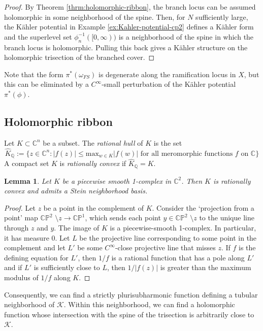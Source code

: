 \documentclass[11pt]{amsart}
\newtheorem{lemma}[theorem]{Lemma}
\theoremstyle{definition}
\theoremstyle{remark}
\numberwithin{equation}{section}
\newcommand{\QQ}{\mathbb{Q}}
\newcommand{\cK}{\mathcal{K}}
\newcommand{\CC}{\mathbb{C}}
\newcommand{\CP}{\mathbb{CP}}
\begin{document}
\begin{proof}
    By Theorem \ref{thrm:holomorphic-ribbon}, the branch locus can be assumed holomorphic in some neighborhood of the spine.  Then, for $N$ sufficiently large, the K\"ahler potential in Example \ref{ex:Kahler-potential-cp2} defines a K\"ahler form and the superlevel set $\phi_n^{-1}([0,\infty))$ is a neighborhood of the spine in which the branch locus is holomorphic.  Pulling this back gives a K\"ahler structure on the holomorphic trisection of the branched cover. 
\end{proof}

    Note that the form $\pi^*(\omega_{FS})$ is degenerate along the ramification locus in $X$, but this can be eliminated by a $C^{\infty}$-small perturbation of the K\"ahler potential $\pi^*(\phi)$.


\subsection{Holomorphic ribbon}

Let $K \subset \CC^n$ be a subset.  The {\it rational hull} of $K$ is the set
\[\widehat{K}_{\QQ} := \{z \in \CC^n : |f(z)| \leq \text{max}_{w \in K} |f(w)| \text{ for all meromorphic functions $f$ on $\CC$}\} \]
A compact set $K$ is {\it rationally convex} if $\widehat{K}_{\QQ} = K$.  

\begin{lemma}
    Let $K$ be a piecewise smooth 1-complex in $\CC^2$.  Then $K$ is rationally convex and admits a Stein neighborhood basis.  
\end{lemma}

\begin{proof}
    Let $z$ be a point in the complement of $K$.  Consider the `projection from a point' map $\CP^{2}$ $\setminus z \rightarrow \CP^1$, which sends each point $y \in \CP^{2}$ $\setminus z$ to the unique line through $z$ and $y$.  The image of $K$ is a piecewise-smooth 1-complex.  In particular, it has measure 0.  Let $L$ be the projective line corresponding to some point in the complement and let $L'$ be some $C^{\infty}$-close projective line that misses $z$.  If $f$ is the defining equation for $L'$, then $1/f$ is a rational  function that has a pole along $L'$ and if $L'$ is sufficiently close to $L$, then $1/|f(z)|$ is greater than the maximum modulus of $1/f$ along $K$.
\end{proof}

Consequently, we can find a strictly plurisubharmonic function defining a tubular neighborhood of $\cK$.  Within this neighborhood, we can find a holomorphic function whose intersection with the spine of the trisection is arbitrarily close to $\cK$. 
\end{document}
